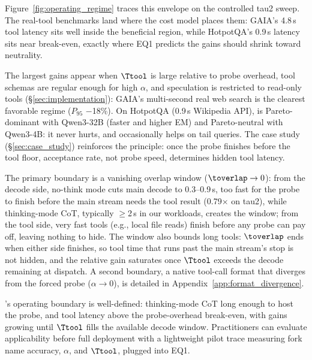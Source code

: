 Figure~\ref{fig:operating_regime} traces this envelope on the controlled tau2 sweep.
The real-tool benchmarks land where the cost model places them: GAIA's 4.8\,s tool
latency sits well inside the beneficial region, while HotpotQA's 0.9\,s latency sits
near break-even, exactly where EQ1 predicts the gains should shrink toward neutrality.

The largest gains appear when $\Ttool$ is large relative to probe overhead, tool schemas
are regular enough for high $\alpha$, and speculation is restricted to read-only
tools (\S\ref{sec:implementation}): GAIA's multi-second real web search is the
clearest favorable regime ($P_{95}$ $-$18\%).
On HotpotQA (0.9\,s Wikipedia API), \spork{} is Pareto-dominant with Qwen3-32B (faster and
higher EM) and Pareto-neutral with Qwen3-4B: it never hurts, and occasionally helps on
tail queries.
The case study (\S\ref{sec:case_study}) reinforces the principle: once the probe finishes
before the tool floor, acceptance rate, not probe speed, determines hidden tool latency.

The primary boundary is a vanishing overlap window ($\toverlap \to 0$): from the decode
side, no-think mode cuts main decode to 0.3--0.9\,s, too fast for the probe to finish
before the main stream needs the tool result (0.79$\times$ on tau2), while thinking-mode
CoT, typically $\geq$2\,s in our workloads, creates the window; from the tool side, very
fast tools (e.g., local file reads) finish before any probe can pay off, leaving nothing
to hide.
The window also bounds long tools: $\toverlap$ ends when either side finishes, so tool
time that runs past the main stream's stop is not hidden, and the relative gain
saturates once $\Ttool$ exceeds the decode remaining at dispatch.
A second boundary, a native tool-call format that diverges from the forced probe
($\alpha \to 0$), is detailed in Appendix~\ref{app:format_divergence}.

\spork{}'s operating boundary is well-defined: thinking-mode CoT long enough to host the
probe, and tool latency above the probe-overhead break-even, with gains growing until
$\Ttool$ fills the available decode window.
Practitioners can evaluate applicability before full deployment with a lightweight pilot
trace measuring fork name accuracy, $\alpha$, and $\Ttool$, plugged into EQ1.

\FloatBarrier
